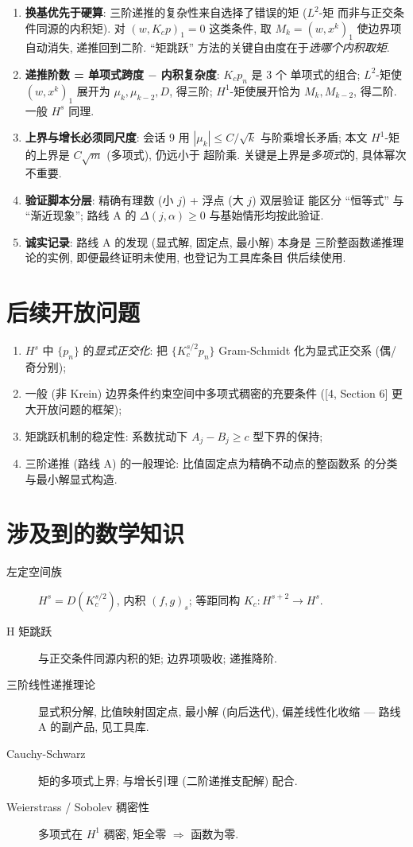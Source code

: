\documentclass[UTF8]{ctexart}
\begin{document}
\begin{enumerate}
	\item \textbf{换基优先于硬算}: 三阶递推的复杂性来自选择了错误的矩 ($L^2$-矩
		而非与正交条件同源的内积矩). 对 $(w, K_c p)_1 = 0$ 这类条件, 取
		$M_k = (w, x^k)_1$ 使边界项自动消失, 递推回到二阶. ``矩跳跃''
		方法的关键自由度在于\emph{选哪个内积取矩}.
	\item \textbf{递推阶数 = 单项式跨度 $-$ 内积复杂度}: $K_c p_n$ 是 3 个
		单项式的组合; $L^2$-矩使 $(w, x^k)_1$ 展开为 $\mu_k, \mu_{k-2}, D$,
		得三阶; $H^1$-矩使展开恰为 $M_k, M_{k-2}$, 得二阶. 一般 $H^s$ 同理.
	\item \textbf{上界与增长必须同尺度}: 会话 9 用 $|\mu_k| \leq C/\sqrt k$
		与阶乘增长矛盾; 本文 $H^1$-矩的上界是 $C\sqrt m$ (多项式), 仍远小于
		超阶乘. 关键是上界是\emph{多项式}的, 具体幂次不重要.
	\item \textbf{验证脚本分层}: 精确有理数 (小 $j$) + 浮点 (大 $j$) 双层验证
		能区分 ``恒等式'' 与 ``渐近现象''; 路线 A 的 $\Delta(j,\alpha) \geq 0$
		与基始情形均按此验证.
	\item \textbf{诚实记录}: 路线 A 的发现 (显式解, 固定点, 最小解) 本身是
		三阶整函数递推理论的实例, 即便最终证明未使用, 也登记为工具库条目
		供后续使用.
\end{enumerate}

\section{后续开放问题}

\begin{enumerate}
	\item $H^s$ 中 $\{p_n\}$ 的\emph{显式正交化}: 把 $\{K_c^{s/2} p_n\}$
		Gram-Schmidt 化为显式正交系 (偶/奇分别);
	\item 一般 (非 Krein) 边界条件约束空间中多项式稠密的充要条件
		([4, Section 6] 更大开放问题的框架);
	\item 矩跳跃机制的稳定性: 系数扰动下 $A_j - B_j \geq c$ 型下界的保持;
	\item 三阶递推 (路线 A) 的一般理论: 比值固定点为精确不动点的整函数系
		的分类与最小解显式构造.
\end{enumerate}

\section{涉及到的数学知识}

\begin{description}
	\item[左定空间族] $H^s = D(K_c^{s/2})$, 内积 $(f,g)_s$; 等距同构
		$K_c: H^{s+2} \to H^s$.
	\item[H 矩跳跃] 与正交条件同源内积的矩; 边界项吸收; 递推降阶.
	\item[三阶线性递推理论] 显式积分解, 比值映射固定点, 最小解 (向后迭代),
		偏差线性化收缩 — 路线 A 的副产品, 见工具库.
	\item[Cauchy-Schwarz] 矩的多项式上界; 与增长引理 (二阶递推支配解) 配合.
	\item[Weierstrass / Sobolev 稠密性] 多项式在 $H^1$ 稠密, 矩全零
		$\Rightarrow$ 函数为零.
\end{description}
\end{document}
